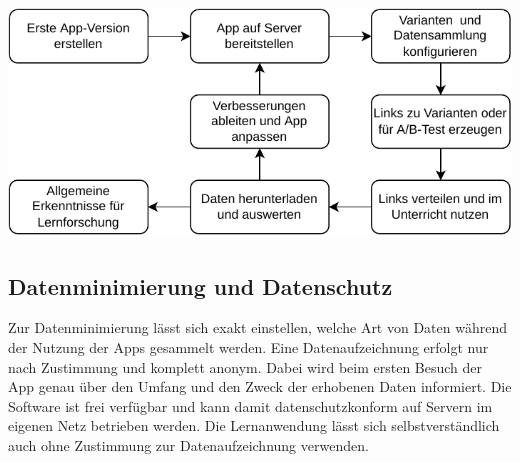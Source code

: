 \documentclass[a0,portrait]{a0poster}
\begin{document}
\begin{multicols}{2}
\begin{center}\vspace{1cm}
\includegraphics[width=0.6\linewidth]{la-cycle}
\end{center}\vspace{1cm}

\subsection*{Datenminimierung und Datenschutz}

Zur Datenminimierung lässt sich exakt einstellen, welche Art von Daten während der Nutzung der Apps gesammelt werden. Eine Datenaufzeichnung erfolgt nur nach Zustimmung und komplett anonym. Dabei wird beim ersten Besuch der App genau über den Umfang und den Zweck der erhobenen Daten informiert. Die Software ist frei verfügbar und kann damit datenschutzkonform auf Servern im eigenen Netz betrieben werden. Die Lernanwendung lässt sich selbstverständlich auch ohne Zustimmung zur Datenaufzeichnung verwenden.




%
%



\end{multicols}
\end{document}
